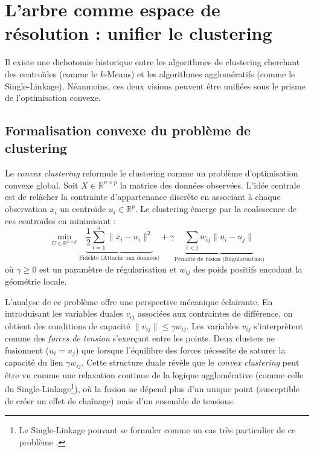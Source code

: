 \section{L'arbre comme espace de résolution : unifier le clustering}

Il existe une dichotomie historique entre les algorithmes de clustering cherchant des centroïdes (comme le $k$-Means) et les algorithmes agglomératifs (comme le Single-Linkage). Néanmoins, ces deux visions peuvent être unifiées sous le prisme de l'optimisation convexe.

\subsection{Formalisation convexe du problème de clustering}
\label{sec:convex_clustering}

Le \emph{convex clustering} \cite{hocking2011clusterpath, chi2015splitting} reformule le clustering comme un problème d'optimisation convexe global. Soit $X \in \mathbb{R}^{n \times p}$ la matrice des données observées. L'idée centrale est de relâcher la contrainte d'appartenance discrète en associant à chaque observation $x_i$ un centroïde $u_i \in \mathbb{R}^{p}$. Le clustering émerge par la coalescence de ces centroïdes en minimisant :
\[
    \min_{U \in \mathbb{R}^{n \times p}} \underbrace{\frac{1}{2} \sum_{i=1}^n \|x_i - u_i\|^2}_{\text{Fidélité (Attache aux données)}} + \gamma \underbrace{\sum_{i < j} w_{ij} \|u_i - u_j\|}_{\text{Pénalité de fusion (Régularisation)}}
    \label{eq:convex_clustering}
\]
où $\gamma \ge 0$ est un paramètre de régularisation et $w_{ij}$ des poids positifs encodant la géométrie locale. 

L'analyse de ce problème \cite{tan2015statistical} offre une perspective mécanique éclairante. En introduisant les variables duales $v_{ij}$ associées aux contraintes de différence, on obtient des conditions de capacité $\|v_{ij}\| \le \gamma w_{ij}$. Les variables $v_{ij}$ s'interprètent comme des \emph{forces de tension} s'exerçant entre les points. Deux clusters ne fusionnent ($u_i = u_j$) que lorsque l'équilibre des forces nécessite de saturer la capacité du lien $\gamma w_{ij}$. 
Cette structure duale révèle que le \emph{convex clustering} peut être vu comme une relaxation continue de la logique agglomérative  (comme celle du Single-Linkage\footnote{Le Single-Linkage pouvant se formuler comme un cas très particulier de ce problème \cite{tan2015statistical}.}), où la fusion ne dépend plus d'un unique point (susceptible de créer un effet de chaînage) mais d'un ensemble de tensions. 

